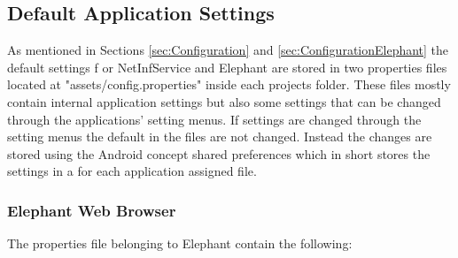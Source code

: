 \subsection{Default Application Settings}

As mentioned in Sections \ref{sec:Configuration} and \ref{sec:ConfigurationElephant} the default settings f
or NetInfService and Elephant are stored in two properties files located at "assets/config.properties" inside each projects folder. 
These files mostly contain internal application settings but also some settings that can be changed through the applications' 
setting menus. If settings are changed through the setting menus 
the default in the files are not changed. Instead the changes are stored using 
the Android concept shared preferences which in short stores the settings in a for each application assigned file.

\subsubsection{Elephant Web Browser}
\label{sec:MaintElephantSettings}

The properties file belonging to Elephant contain the following:

